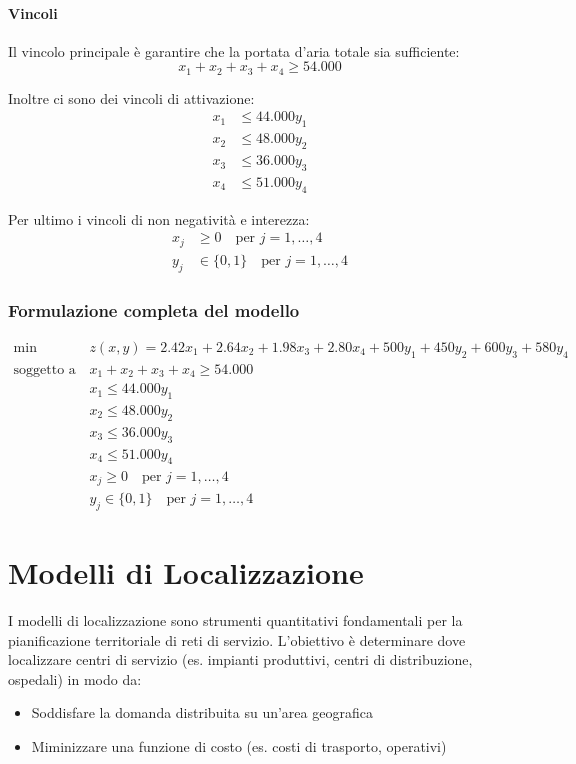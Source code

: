 \paragraph{Vincoli}
Il vincolo principale è garantire che la portata d'aria totale sia sufficiente:
\[
x_1 + x_2 + x_3 + x_4 \geq 54.000
\]

Inoltre ci sono dei vincoli di attivazione:
\[
\begin{aligned}
x_1 &\leq 44.000 y_1 \\
x_2 &\leq 48.000 y_2 \\
x_3 &\leq 36.000 y_3 \\
x_4 &\leq 51.000 y_4
\end{aligned}
\]

Per ultimo i vincoli di non negatività e interezza:
\[
\begin{aligned}
x_j &\geq 0 \quad \text{per } j = 1, \dots, 4 \\
y_j &\in \{0, 1\} \quad \text{per } j = 1, \dots, 4
\end{aligned}
\]

\subsubsection{Formulazione completa del modello}
\[
\begin{aligned}
\min \quad & z(x, y) = 2.42x_1 + 2.64x_2 + 1.98x_3 + 2.80x_4 + 500y_1 + 450y_2 + 600y_3 + 580y_4 \\
\text{soggetto a} \quad & x_1 + x_2 + x_3 + x_4 \geq 54.000 \\
& x_1 \leq 44.000 y_1 \\
& x_2 \leq 48.000 y_2 \\
& x_3 \leq 36.000 y_3 \\
& x_4 \leq 51.000 y_4 \\
& x_j \geq 0 \quad \text{per } j = 1, \dots, 4 \\
& y_j \in \{0, 1\} \quad \text{per } j = 1, \dots, 4
\end{aligned}
\]

\section{Modelli di Localizzazione}
I modelli di localizzazione sono strumenti quantitativi fondamentali 
per la pianificazione territoriale di reti di servizio. L'obiettivo è 
determinare dove localizzare centri di servizio (es. impianti produttivi, 
centri di distribuzione, ospedali) in modo da:
\begin{itemize}
    \item Soddisfare la domanda distribuita su un'area geografica
    \item Miminizzare una funzione di costo (es. costi di trasporto, operativi)
\end{itemize}

